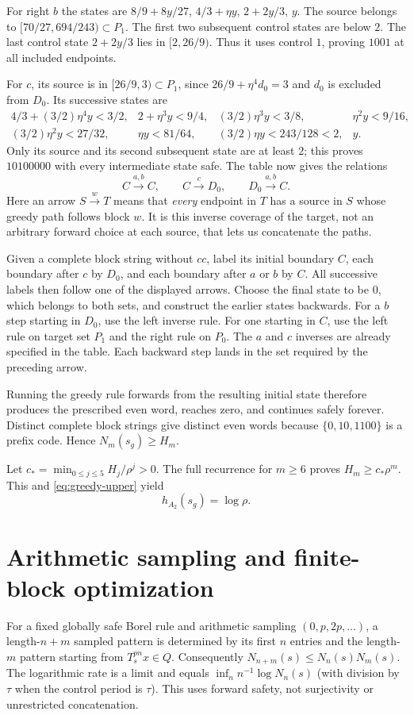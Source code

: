 \documentclass[11pt,reqno]{amsart}
\numberwithin{equation}{section}
\theoremstyle{definition}
\theoremstyle{definition}
\begin{document}
For right $b$ the states are
$8/9+8y/27$, $4/3+\eta y$, $2+2y/3$, $y$.
The source belongs to $[70/27,694/243)\subset P_1$.
The first two subsequent control states are below $2$.
The last control state $2+2y/3$ lies in $[2,26/9)$.
Thus it uses control $1$, proving $1001$ at all included endpoints.

For $c$, its source is in $[26/9,3)\subset P_1$, since
$26/9+\eta^4d_0=3$ and $d_0$ is excluded from $D_0$.
Its successive states are
\[
\begin{array}{llll}
4/3+(3/2)\eta^4y<3/2,&2+\eta^3y<9/4,&
(3/2)\eta^3y<3/8,&\eta^2y<9/16,\\
(3/2)\eta^2y<27/32,&\eta y<81/64,&
(3/2)\eta y<243/128<2,&y.
\end{array}
\]
Only its source and its second subsequent state are at least $2$;
this proves $10100000$ with every intermediate state safe.
The table now gives the relations
\[
 C\xrightarrow{a,b}C,\qquad C\xrightarrow cD_0,
 \qquad D_0\xrightarrow{a,b}C.
\]
Here an arrow $S\xrightarrow{w}T$ means that \emph{every}
endpoint in $T$ has a source in $S$ whose greedy path follows
block $w$. It is this inverse coverage of the target, not an
arbitrary forward choice at each source, that lets us concatenate
the paths.

Given a complete block string without $cc$, label its initial
boundary $C$, each boundary after $c$ by $D_0$, and each boundary
after $a$ or $b$ by $C$. All successive labels then follow one of
the displayed arrows. Choose the final state to be $0$, which
belongs to both sets, and construct the earlier states backwards.
For a $b$ step starting in $D_0$, use the left inverse rule.
For one starting in $C$, use the left rule on target set $P_1$
and the right rule on $P_0$. The $a$ and $c$ inverses are already
specified in the table. Each backward step lands in the set
required by the preceding arrow.

Running the greedy rule forwards from the resulting initial state
therefore produces the prescribed even word, reaches zero, and
continues safely forever. Distinct complete block strings give
distinct even words because $\{0,10,1100\}$ is a prefix code.
Hence $N_m(s_g)\ge H_m$.

Let $c_* =\min_{0\le j\le5}H_j/\rho^j>0$. The full recurrence
for $m\ge6$ proves $H_m\ge c_*\rho^m$. This and
\eqref{eq:greedy-upper} yield
\begin{equation}\label{eq:greedy-exact}
 h_{A_2}(s_g)=\log\rho.
\end{equation}
\section{Arithmetic sampling and finite-block optimization}
\label{app:finiteblock}
For a fixed globally safe Borel rule and arithmetic sampling
$(0,p,2p,\ldots)$, a length-$n+m$ sampled pattern is determined
by its first $n$ entries and the length-$m$ pattern starting from
$T_s^{pn}x\in Q$. Consequently $N_{n+m}(s)\le N_n(s)N_m(s)$.
The logarithmic rate is a limit and equals
$\inf_n n^{-1}\log N_n(s)$ (with division by $\tau$ when
the control period is $\tau$). This uses forward safety, not
surjectivity or unrestricted concatenation.
\end{document}
